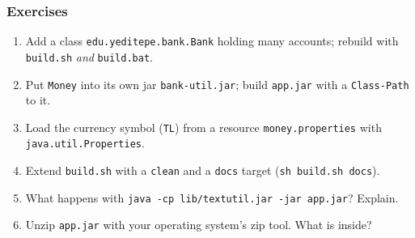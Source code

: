 \documentclass[aspectratio=169,10pt,compress]{beamer}
\begin{document}
\begin{frame}[t,fragile] \frametitle{Exercises}
  \begin{enumerate}\small
    \item Add a class \texttt{edu.yeditepe.bank.Bank} holding many accounts; rebuild with \texttt{build.sh} \emph{and} \texttt{build.bat}.
    \item Put \texttt{Money} into its own jar \texttt{bank-util.jar}; build \texttt{app.jar} with a \texttt{Class-Path} to it.
    \item Load the currency symbol (\texttt{TL}) from a resource \texttt{money.properties} with \texttt{java.util.Properties}.
    \item Extend \texttt{build.sh} with a \texttt{clean} and a \texttt{docs} target (\texttt{sh build.sh docs}).
    \item What happens with \texttt{java -cp lib/textutil.jar -jar app.jar}? Explain.
    \item Unzip \texttt{app.jar} with your operating system's zip tool. What is inside?
  \end{enumerate}
\end{frame}




\begin{frame}[t,fragile]
	\begin{center}
		\vspace{4cm}
	\end{center}
\end{frame}
\end{document}
